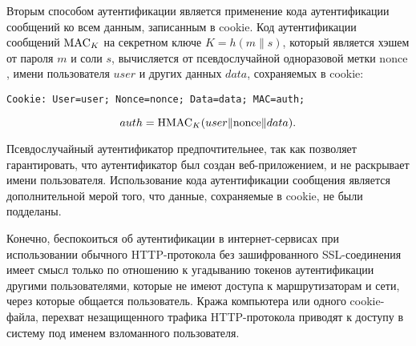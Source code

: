 Вторым способом аутентификации является применение кода аутентификации сообщений ко всем данным, записанным в cookie. Код аутентификации сообщений $\textrm{MAC}_K$ на секретном ключе $K = h(m \| s)$, который является хэшем от пароля $m$ и соли $s$, вычисляется от псевдослучайной одноразовой метки $\textrm{nonce}$, имени пользователя $user$ и других данных $data$, сохраняемых в cookie:
\begin{center} \begin{verbatim}
Cookie: User=user; Nonce=nonce; Data=data; MAC=auth;
\end{verbatim} \end{center}
    \[ auth = \textrm{HMAC}_K(user \| \textrm{nonce} \| data). \]

Псевдослучайный аутентификатор предпочтительнее, так как позволяет гарантировать, что аутентификатор был создан веб-приложением, и не раскрывает имени пользователя. Использование кода аутентификации сообщения является дополнительной мерой того, что данные, сохраняемые в cookie, не были подделаны.

Конечно, беспокоиться об аутентификации в интернет-сервисах при использовании обычного HTTP-протокола без зашифрованного SSL-соединения имеет смысл только по отношению к угадыванию токенов аутентификации другими пользователями, которые не имеют доступа к маршрутизаторам и сети, через которые общается пользователь. Кража компьютера или одного cookie-файла, перехват незащищенного трафика HTTP-протокола приводят к доступу в систему под именем взломанного пользователя.
